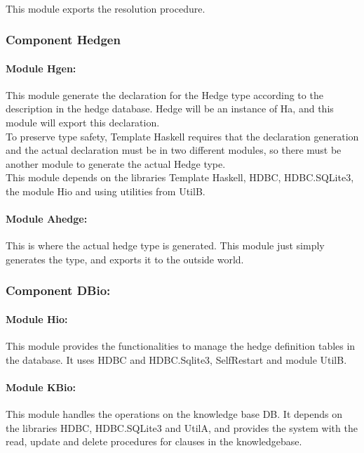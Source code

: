 \documentclass[../gr-final.tex]{subfiles}
\begin{document}
\paragraph{}This module exports the resolution procedure.

\subsubsection{Component Hedgen}

\paragraph{Module Hgen:} This module generate the declaration for the Hedge type
according to the description in the hedge database. Hedge will be an
instance of Ha, and this module will export this declaration.\\
To preserve type safety, Template Haskell requires that the declaration
generation and the actual declaration must be in two different
modules, so there must be another module to generate the actual Hedge type.\\
This module depends on the libraries Template Haskell, HDBC,
HDBC.SQLite3, the module Hio and using utilities from UtilB.\\
\paragraph{Module Ahedge:} This is where the actual hedge type is
generated. This module just simply generates the type, and exports it
to the outside world.

\subsubsection{Component DBio:}
\paragraph{Module Hio:} This module provides the functionalities to manage the
hedge definition tables in the database. It uses HDBC and
HDBC.Sqlite3, SelfRestart and module UtilB. 
\paragraph{Module KBio:} This module handles the operations on the
knowledge base DB. It depends on the libraries HDBC, HDBC.SQLite3 and
UtilA, and provides the system with the read, update and delete
procedures for clauses in the knowledgebase.
\end{document}
